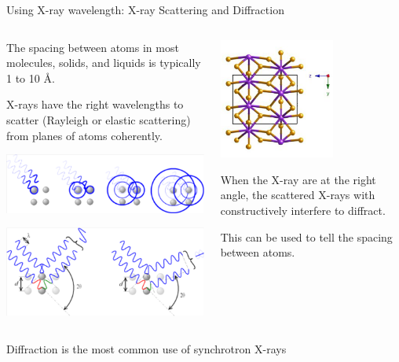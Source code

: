 \begin{slide}{Using X-ray wavelength: X-ray Scattering and Diffraction}

   \begin{columns}[T]
   \begin{column}{75mm}

     The spacing between atoms in most molecules, solids, and liquids is
     typically 1 to 10 {\AA}.

    \vmm
     X-rays have the right wavelengths to scatter
     (Rayleigh or elastic scattering) from planes of atoms coherently.
     \vmm
     
     \includegraphics[width=67mm]{figs/images/XRD_Scatter}

     \vmm
     \includegraphics[width=67mm]{figs/images/XRD_diffract}

     \end{column}

     \begin{column}{47mm}

       \includegraphics[width=38mm]{figs/images/XRD_XTAL}

       
       When the X-ray are at the right angle, the scattered X-rays with
       constructively interfere to diffract.

       \vmm
 
       This can be used to tell the spacing between atoms.
       
     \end{column}
    \end{columns}

    \begin{postitbox}{80mm}
      Diffraction is the most common use of synchrotron X-rays
    \end{postitbox}

 \vfill
\end{slide}     

